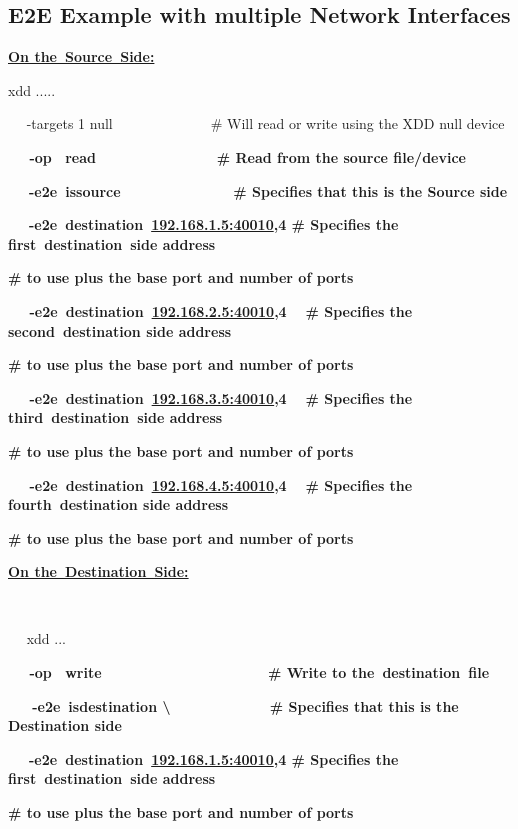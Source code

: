 \subsection{E2E Example with multiple Network Interfaces}\label{e2e-example-with-multiple-network-interfaces}

\textbf{\ul{On the~Source~Side:}}

xdd .....~

~~ -targets 1 null ~ ~ ~ ~ ~ ~ ~ ~ \# Will read or write using the XDD null device

\textbf{~~ -op ~read ~ ~ ~ ~ ~ ~ ~ ~ ~\# Read from the source file/device}

~~~\textbf{-e2e~issource ~ ~ ~ ~ ~ ~ ~ ~ \# Specifies that this is the Source side}

~~~\textbf{-e2e~destination~\href{http://192.168.1.5:40010/}{192.168.1.5:40010},4 \# Specifies the first~destination~side address}

\textbf{\# to use plus the base port and number of ports}

\textbf{~~ -e2e~destination~\href{http://192.168.2.5:40010/}{192.168.2.5:40010},4 ~ \# Specifies the second~destination side address}

\textbf{\# to use plus the base port and number of ports}

\textbf{~~ -e2e~destination~\href{http://192.168.3.5:40010/}{192.168.3.5:40010},4 ~ \# Specifies the third~destination~side address}

\textbf{\# to use plus the base port and number of ports}

\textbf{~~ -e2e~destination~\href{http://192.168.4.5:40010/}{192.168.4.5:40010},4 ~ \# Specifies the fourth~destination side address}

\textbf{\# to use plus the base port and number of ports}

\textbf{\ul{On the~Destination~Side:}}

~

~~ xdd ...

\textbf{~~ -op ~write ~ ~ ~ ~ ~ ~ ~ ~ ~ ~ ~ ~ \# Write to the~destination~file}

\textbf{~~~-e2e~isdestination \textbackslash{} ~ ~ ~ ~ ~ ~ ~ \# Specifies that this is the Destination side}

~~~\textbf{-e2e~destination~\href{http://192.168.1.5:40010/}{192.168.1.5:40010},4 \# Specifies the first~destination~side address}

\textbf{\# to use plus the base port and number of ports}

